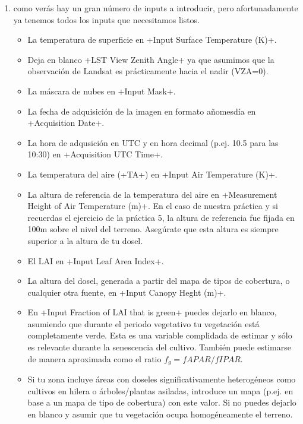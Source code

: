 \documentclass[a4paper,11pt]{article}
\begin{document}
\begin{enumerate}
     \item como verás hay un gran número de inputs a introducir, pero afortunadamente ya tenemos todos los inputs que necesitamos listos.
     \begin{itemize}
      \item La temperatura de superficie en \cverb+Input Surface Temperature (K)+.
      
      \item Deja en blanco \cverb+LST View Zenith Angle+ ya que asumimos que la observación de Landsat es prácticamente hacia el nadir (VZA=0).
      
      \item La máscara de nubes en \cverb+Input Mask+.
      
      \item La fecha de adquisición de la imagen en formato añomesdía en \cverb+Acquisition Date+.
      
      \item La hora de adqusición en UTC y en hora decimal (p.ej. 10.5 para las 10:30) en \cverb+Acquisition UTC Time+.
      
      \item La temperatura del aire (\cverb+TA+) en \cverb+Input Air Temperature (K)+.
      
      \item La altura de referencia de la temperatura del aire en \cverb+Measurement Height of Air Temperature (m)+. En el caso de nuestra práctica y si recuerdas el ejercicio de la práctica 5, la altura de referencia fue fijada en 100m sobre el nivel del terreno. Asegúrate que esta altura es siempre superior a la altura de tu dosel.
      
      \item El LAI en \cverb+Input Leaf Area Index+.
      
      \item La altura del dosel, generada a partir del mapa de tipos de cobertura, o cualquier otra fuente, en \cverb+Input Canopy Heght (m)+.
      
      \item En \cverb+Input Fraction of LAI that is green+ puedes dejarlo en blanco, asumiendo que durante el periodo vegetativo tu vegetación está completamente verde. Esta es una variable complidada de estimar y sólo es relevante durante la senescencia del cultivo. También puede estimarse de manera aproximada como el ratio $f_g=fAPAR/fIPAR$.
      
      \item Si tu zona incluye áreas con doseles significativamente heterogéneos como cultivos en hilera o árboles/plantas asiladas, introduce un mapa (p.ej. en base a un mapa de tipo de cobertura) con este valor. Si no puedes dejarlo en blanco y asumir que tu vegetación ocupa homogéneamente el terreno.
      

\end{itemize}
\end{enumerate}
\end{document}
